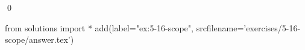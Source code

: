 
\begin{ex}
  \label{ex:5-16-scope}
  
  \qed
\end{ex}
\begin{python0}
from solutions import *
add(label="ex:5-16-scope",
    srcfilename='exercises/5-16-scope/answer.tex')
\end{python0}

